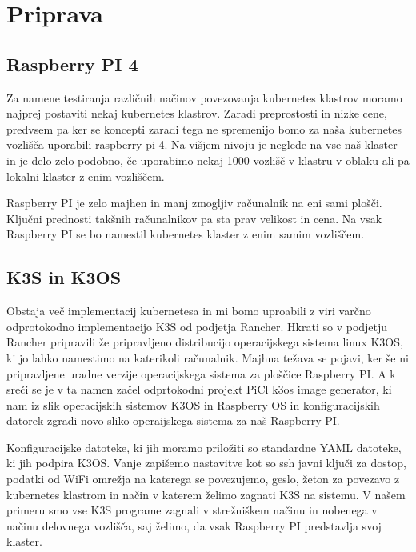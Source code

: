 \documentclass[a4paper, 12pt]{book}
\begin{document}
\chapter{Priprava}

\section{Raspberry PI 4}
Za namene testiranja različnih načinov povezovanja kubernetes klastrov moramo najprej postaviti nekaj kubernetes klastrov.
Zaradi preprostosti in nizke cene, predvsem pa ker se koncepti zaradi tega ne spremenijo bomo za naša kubernetes vozlišča uporabili raspberry pi 4.
Na višjem nivoju je neglede na vse naš klaster in je delo zelo podobno, če uporabimo nekaj 1000 vozlišč v klastru v oblaku ali pa lokalni klaster z enim vozliščem.

Raspberry PI je zelo majhen in manj zmogljiv računalnik na eni sami plošči.
Ključni prednosti takšnih računalnikov pa sta prav velikost in cena.
Na vsak Raspberry PI se bo namestil kubernetes klaster z enim samim vozliščem.

\section{K3S in K3OS}
Obstaja več implementacij kubernetesa in mi bomo uproabili z viri varčno odprotokodno implementacijo K3S od podjetja Rancher. Hkrati so v podjetju Rancher pripravili že pripravljeno distribucijo operacijskega sistema linux K3OS, ki jo lahko namestimo na katerikoli računalnik. 
Majhna težava se pojavi, ker še ni pripravljene uradne verzije operacijskega sistema za ploščice Raspberry PI.
A k sreči se je v ta namen začel odprtokodni projekt PiCl k3os image generator, ki nam iz slik operacijskih sistemov K3OS in Raspberry OS in konfiguracijskih datorek zgradi novo sliko operaijskega sistema za naš Raspberry PI.

Konfiguracijske datoteke, ki jih moramo priložiti so standardne YAML datoteke, ki jih podpira K3OS.
Vanje zapišemo nastavitve kot so ssh javni ključi za dostop, podatki od WiFi omrežja na katerega se povezujemo, geslo, žeton za povezavo z kubernetes klastrom in način v katerem želimo zagnati K3S na sistemu.
V našem primeru smo vse K3S programe zagnali v strežniškem načinu in nobenega v načinu delovnega vozlišča, saj želimo, da vsak Raspberry PI predstavlja svoj klaster.
\end{document}
